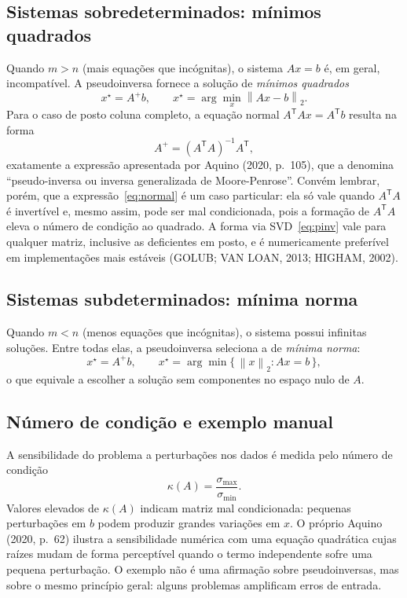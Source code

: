 \documentclass[12pt,a4paper,oneside]{report}
\newcommand{\norm}[1]{\left\lVert #1 \right\rVert}
\newcommand{\T}{^{\mathsf{T}}}
\newcommand{\Ap}{A^{+}}
\begin{document}
\subsection{Sistemas sobredeterminados: mínimos quadrados}

Quando $m > n$ (mais equações que incógnitas), o sistema $Ax = b$ é, em geral, incompatível.
A pseudoinversa fornece a solução de \emph{mínimos quadrados}
\begin{equation}
x^\star = \Ap b, \qquad
x^\star = \arg\min_x \norm{Ax - b}_2 .
\label{eq:mq}
\end{equation}
Para o caso de posto coluna completo, a equação normal $A\T A x = A\T b$ resulta na forma
\begin{equation}
\Ap = (A\T A)^{-1} A\T,
\label{eq:normal}
\end{equation}
exatamente a expressão apresentada por Aquino (2020, p.~105), que a denomina ``pseudo-inversa
ou inversa generalizada de Moore-Penrose''. Convém lembrar, porém, que a expressão~\eqref{eq:normal} é um caso particular: ela só vale quando $A\T A$ é invertível e, mesmo assim, pode ser mal condicionada, pois a formação de $A\T A$ eleva o número de condição ao quadrado. A forma via SVD~\eqref{eq:pinv} vale para qualquer matriz, inclusive as deficientes em posto, e é numericamente preferível em implementações mais estáveis (GOLUB; VAN LOAN, 2013; HIGHAM, 2002).

\subsection{Sistemas subdeterminados: mínima norma}

Quando $m < n$ (menos equações que incógnitas), o sistema possui infinitas soluções. Entre
todas elas, a pseudoinversa seleciona a de \emph{mínima norma}:
\begin{equation}
x^\star = \Ap b, \qquad
x^\star = \arg\min \{\, \norm{x}_2 : Ax = b \,\},
\end{equation}
o que equivale a escolher a solução sem componentes no espaço nulo de $A$.

\subsection{Número de condição e exemplo manual}

A sensibilidade do problema a perturbações nos dados é medida pelo número de condição
\begin{equation}
\kappa(A) = \frac{\sigma_{\max}}{\sigma_{\min}} .
\end{equation}
Valores elevados de $\kappa(A)$ indicam matriz mal condicionada: pequenas perturbações em $b$
podem produzir grandes variações em $x$. O próprio Aquino (2020, p.~62) ilustra a sensibilidade
numérica com uma equação quadrática cujas raízes mudam de forma perceptível quando o termo
independente sofre uma pequena perturbação. O exemplo não é uma afirmação sobre pseudoinversas,
mas sobre o mesmo princípio geral: alguns problemas amplificam erros de entrada.
\end{document}
